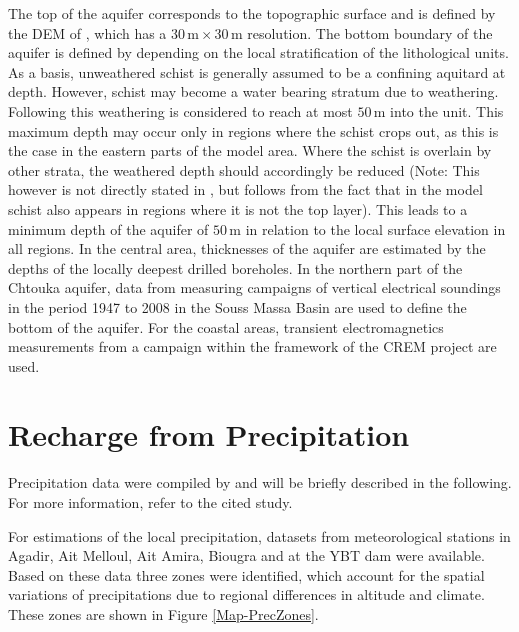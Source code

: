 The top of the aquifer corresponds to the topographic surface and is defined by the DEM of \textcite{NASA.SRTM1Arc}, which has a $30 \, \textrm{m} \times 30 \, \textrm{m}$ resolution. 
The bottom boundary of the aquifer is defined by \textcite{Horn.2021} depending on the local stratification of the lithological units. 
As a basis, unweathered schist is generally assumed to be a confining aquitard at depth. 
However, schist may become a water bearing stratum due to weathering. 
Following \textcite{McFadden.2005} this weathering is considered to reach at most $50 \, \textrm{m}$ into the unit. 
This maximum depth may occur only in regions where the schist crops out, as this is the case in the eastern parts of the model area. 
Where the schist is overlain by other strata, the weathered depth should accordingly be reduced (Note: This however is not directly stated in \textcite{Horn.2021}, but follows from the fact that in the model schist also appears in regions where it is not the top layer). 
This leads to a minimum depth of the aquifer of $50 \, \textrm{m}$ in relation to the local surface elevation in all regions. 
In the central area, thicknesses of the aquifer are estimated by the depths of the locally deepest drilled boreholes. 
In the northern part of the Chtouka aquifer, data from measuring campaigns of vertical electrical soundings in the period 1947 to 2008 in the Souss Massa Basin are used to define the bottom of the aquifer. 
For the coastal areas, transient electromagnetics measurements \parencite{Kalberkamp.2021} from a campaign within the framework of the CREM project are used.




\section{Recharge from Precipitation}
\label{Sec-PrecRech}

Precipitation data were compiled by \textcite{Horn.2021} and will be briefly described in the following. 
For more information, refer to the cited study.
    
For estimations of the local precipitation, datasets from meteorological stations in Agadir, Ait Melloul, Ait Amira, Biougra and at the YBT dam were available. 
Based on these data three zones were identified, which account for the spatial variations of precipitations due to regional differences in altitude and climate. 
These zones are shown in Figure \ref{Map-PrecZones}.

